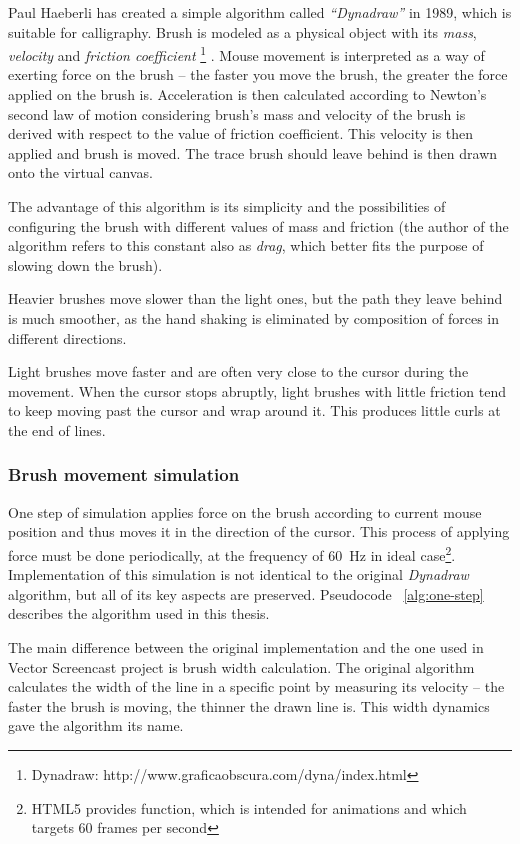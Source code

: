 Paul Haeberli has created a simple algorithm called \textit{``Dynadraw''} in 1989, which is suitable for calligraphy. Brush is modeled as a physical object with its \textit{mass}, \textit{velocity} and \textit{friction coefficient} \footnote{Dynadraw: http://www.graficaobscura.com/dyna/index.html} \cite{}. Mouse movement is interpreted as a way of exerting force on the brush -- the faster you move the brush, the greater the force applied on the brush is. Acceleration is then calculated according to Newton's second law of motion considering brush's mass and velocity of the brush is derived with respect to the value of friction coefficient. This velocity is then applied and brush is moved. The trace brush should leave behind is then drawn onto the virtual canvas.

The advantage of this algorithm is its simplicity and the possibilities of configuring the brush with different values of mass and friction (the author of the algorithm refers to this constant also as \textit{drag}, which better fits the purpose of slowing down the brush).

Heavier brushes move slower than the light ones, but the path they leave behind is much smoother, as the hand shaking is eliminated by composition of forces in different directions.

Light brushes move faster and are often very close to the cursor during the movement. When the cursor stops abruptly, light brushes with little friction tend to keep moving past the cursor and wrap around it. This produces little curls at the end of lines.

\subsubsection*{Brush movement simulation}

One step of simulation applies force on the brush according to current mouse position and thus moves it in the direction of the cursor. This process of applying force must be done periodically, at the frequency of 60~Hz in ideal case\footnote{HTML5 provides  function, which is intended for animations and which targets 60 frames per second}. Implementation of this simulation is not identical to the original \textit{Dynadraw} algorithm, but all of its key aspects are preserved. Pseudocode ~\ref{alg:one-step} describes the algorithm used in this thesis.

The main difference between the original implementation and the one used in Vector Screencast project is brush width calculation. The original algorithm calculates the width of the line in a specific point by measuring its velocity -- the faster the brush is moving, the thinner the drawn line is. This width dynamics gave the algorithm its name.

